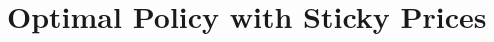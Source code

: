 \documentclass[11pt,a4paper,oneside]{book}
\begin{document}

\chapter{Optimal Policy with Sticky Prices}




\backmatter

\end{document}

